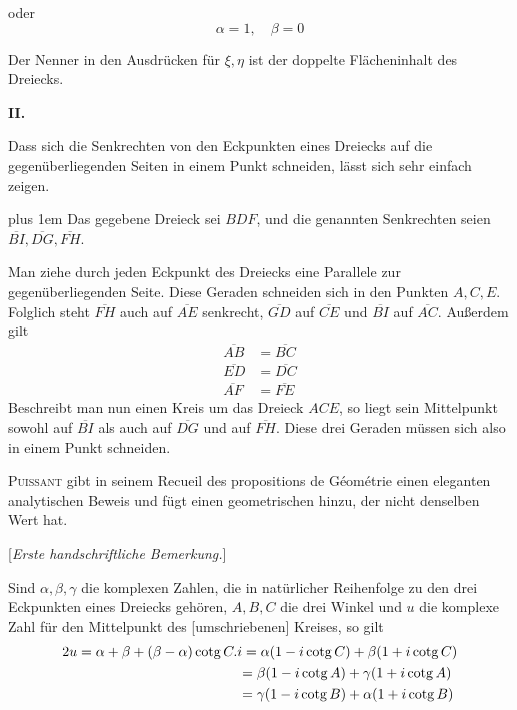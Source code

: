%
oder
\[
\alpha=1,\quad\beta=0
\]
\par
Der Nenner in den Ausdrücken für \(\xi,\eta\) ist der doppelte Flächeninhalt des Dreiecks.

\par\medskip{}
\centerline{\textbf{II.}}\nobreak\smallskip
Dass sich die Senkrechten von den Eckpunkten eines Dreiecks auf die gegenüberliegenden Seiten in einem Punkt schneiden, lässt sich sehr einfach zeigen.

\begingroup\rightskip=0pt plus 1em
Das gegebene Dreieck sei \(BDF\), und die genannten Senkrechten seien \(\overline{BI},\overline{DG},\overline{FH}\).\par
\endgroup

Man ziehe durch jeden Eckpunkt des Dreiecks eine Parallele zur gegenüberliegenden Seite. Diese Geraden schneiden sich in den Punkten \(A,C,E\). Folglich steht \(\overline{FH}\) auch auf \(\overline{AE}\) senkrecht, \(\overline{GD}\) auf \(\overline{CE}\) und \(\overline{BI}\) auf \(\overline{AC}\). Außerdem gilt
\[
\begin{aligned}\overline{AB}&=\overline{BC}\\\overline{ED}&=\overline{DC}\\\overline{AF}&=\overline{FE}\end{aligned}
\]
Beschreibt man nun einen Kreis um das Dreieck \(ACE\), so liegt sein Mittelpunkt sowohl auf \(\overline{BI}\) als auch auf \(\overline{DG}\) und auf \(\overline{FH}\). Diese drei Geraden müssen sich also in einem Punkt schneiden.

\textsc{Puissant} gibt in seinem Recueil des propositions de Géométrie einen eleganten analytischen Beweis und fügt einen geometrischen hinzu, der nicht denselben Wert hat.

\par\medskip{}
\begin{center}[\textit{Erste handschriftliche Bemerkung.}]\end{center}
\hspace*{\parindent}Sind \(\alpha,\beta,\gamma\) die komplexen Zahlen, die in natürlicher Reihenfolge zu den drei Eckpunkten eines Dreiecks gehören, \(A,B,C\) die drei Winkel und \(u\) die komplexe Zahl für den Mittelpunkt des [umschriebenen] Kreises, so gilt
\begingroup\footnotesize
\[
\begin{aligned}
2u&=\alpha+\beta+(\beta-\alpha)\operatorname{cotg}C.i=\alpha(1-i\operatorname{cotg}C)+\beta(1+i\operatorname{cotg}C)\\
&\hphantom{=\alpha+\beta+(\beta-\alpha)\operatorname{cotg}C.i}=\beta(1-i\operatorname{cotg}A)+\gamma(1+i\operatorname{cotg}A)\\
&\hphantom{=\alpha+\beta+(\beta-\alpha)\operatorname{cotg}C.i}=\gamma(1-i\operatorname{cotg}B)+\alpha(1+i\operatorname{cotg}B)
\end{aligned}
\]
\endgroup

